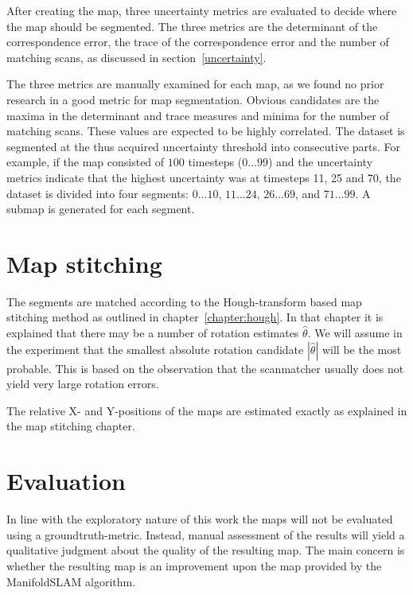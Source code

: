 After creating the map, three uncertainty metrics are evaluated to decide where the map should be segmented. The three metrics are the determinant of the correspondence error, the trace of the correspondence error and the number of matching scans, as discussed in section~\ref{uncertainty}.

The three metrics are manually examined for each map, as we found no prior research in a good metric for map segmentation. Obvious candidates are the maxima in the determinant and trace measures and minima for the number of matching scans. These values are expected to be highly correlated. The dataset is segmented at the thus acquired uncertainty threshold into consecutive parts. For example, if the map consisted of $100$ timesteps ($0 \ldots 99$) and the uncertainty metrics indicate that the highest uncertainty was at timesteps 11, 25 and 70, the dataset is divided into four segments: $0 \ldots 10$, $11 \ldots 24$, $26 \ldots 69$, and $71 \ldots 99$. A submap is generated for each segment.

\section{Map stitching}
The segments are matched according to the Hough-transform based map stitching method as outlined in chapter~\ref{chapter:hough}. In that chapter it is explained that there may be a number of rotation estimates $\hat \theta$. We will assume in the experiment that the smallest absolute rotation candidate $|\hat \theta|$ will be the most probable. This is based on the observation that the scanmatcher usually does not yield very large rotation errors.

The relative X- and Y-positions of the maps are estimated exactly as explained in the map stitching chapter.

\section{Evaluation}
In line with the exploratory nature of this work the maps will not be evaluated using a groundtruth-metric. Instead, manual assessment of the results will yield a qualitative judgment about the quality of the resulting map. The main concern is whether the resulting map is an improvement upon the map provided by the ManifoldSLAM algorithm.